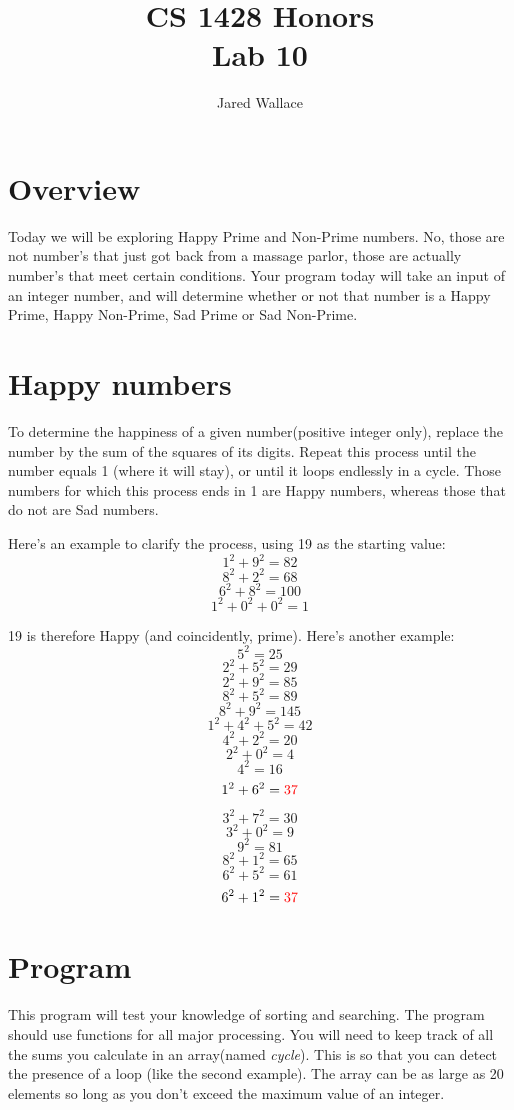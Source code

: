 \documentclass[letterpaper,12pt]{article}
\title{\Large CS 1428 Honors\\Lab 10}
\author{Jared Wallace}
\date{}
\begin{document}
\maketitle

\vspace{30mm}

\section*{Overview}
Today we will be exploring Happy Prime and Non-Prime numbers. No, those are not number's that
just got back from a massage parlor, those are actually number's that meet certain
conditions. Your program today will take an input of an integer number, and will
determine whether or not that number is a Happy Prime, Happy Non-Prime,
Sad Prime or Sad Non-Prime.

\section*{Happy numbers}
To determine the happiness of a given number(positive integer only), replace the number
by the sum of the squares of its digits. Repeat this process until the number equals 1
(where it will stay), or until it loops endlessly in a cycle. Those numbers for which
this process ends in 1 are Happy numbers, whereas those that do not are Sad numbers.

Here's an example to clarify the process, using 19 as the starting value:
$$1^{2} + 9^{2} = 82$$
$$8^{2} + 2^{2} = 68$$
$$6^{2} + 8^{2} = 100$$
$$1^{2} + 0^{2} + 0^{2} = 1$$

19 is therefore Happy (and coincidently, prime). Here's another example:
$$5^{2} = 25$$
$$2^{2} + 5^{2} = 29$$
$$2^{2} + 9^{2} = 85$$
$$8^{2} + 5^{2} = 89$$
$$8^{2} + 9^{2} = 145$$
$$1^{2} + 4^{2} + 5^{2} = 42$$
$$4^{2} + 2^{2} = 20$$
$$2^{2} + 0^{2} = 4$$
$$4^{2} = 16$$
$$1^{2} + 6^{2} = \textcolor{red}{37}$$
$$3^{2} + 7^{2} = 30$$
$$3^{2} + 0^{2} = 9$$
$$9^{2} = 81$$
$$8^{2} + 1^{2} = 65$$
$$6^{2} + 5^{2} = 61$$
$$6^{2} + 1^{2} = \textcolor{red}{37}$$

\section*{Program}
This program will test your knowledge of sorting and searching. The program
should use functions for all major processing.
You will need to keep track of all the sums you calculate in an array(named \emph{cycle}).
This is so that you can detect the presence of a loop (like the second example). The array 
can be as large as 20 elements so long as you don’t exceed the maximum
value of an integer.
\end{document}
